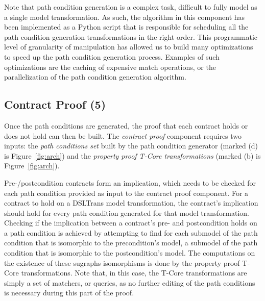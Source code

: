
Note that path condition generation is a complex task, difficult to fully model
as a single model transformation.
As such, the algorithm in this component has been implemented as a Python script
that is responsible for scheduling all the path condition generation
transformations in the right order.
This programmatic level of granularity of manipulation has allowed us to build
many optimizations to speed up the path condition generation process. Examples
of such optimizations are the caching of expensive match operations, or the
parallelization of the path condition generation algorithm.
 
\subsection{Contract Proof (5)}

Once the path conditions are generated, the proof that each contract holds or
does not hold can then be built. The \emph{contract proof} component requires
two inputs: the \emph{path conditions set} built by the path condition generator
(marked (d) is Figure~\ref{fig:arch}) and the \emph{property proof T-Core
transformations} (marked (b) is Figure~\ref{fig:arch}).

Pre-/postcondition contracts form an implication, which needs to be checked for
each path condition provided as input to the contract proof component. For a
contract to hold on a DSLTrans model transformation, the contract's implication
should hold for every path condition generated for that model transformation.
Checking if the implication between a contract's pre- and postcondition holds on
a path condition is achieved by attempting to find for each submodel of the path
condition that is isomorphic to the precondition's model, a submodel of the path
condition that is isomorphic to the postcondition's model.
The computations on the existence of these sugraphs isomorphisms is done by the
property proof T-Core transformations. Note
that, in this case, the T-Core transformations are simply a set of matchers, or
queries, as no further editing of the path conditions is necessary during this
part of the proof.

